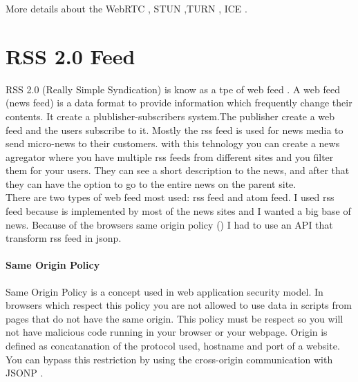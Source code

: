 More details about the WebRTC \cite{loreto2014real}, STUN \cite{mahy2003network},TURN \cite{mahy2010traversal}, ICE \cite{rosenberg2010interactive}.


\section{RSS 2.0 Feed}
\label{sec:rss}

RSS 2.0 (Really Simple Syndication) \cite{board2014rss} is know as a tpe of web feed \cite{downing2008web}.
A web feed (news feed) is a data format to provide information which frequently change their contents.
It create a plublisher-subscribers system.The publisher create a web feed and the users subscribe to it.
Mostly the rss feed is used for news media to send micro-news to their customers. with this tehnology you can
create a news agregator where you have multiple rss feeds from different sites and you filter them for your users.
They can see a short description to the news, and after that they can have the option to go to the entire news
on the parent site. \\
There are two types of web feed most used: rss feed and atom feed. I used rss feed because is implemented by most
of the news sites and I wanted a big base of news. Because of the browsers same origin policy ()
 I had to use an API that transform rss feed in jsonp.


\paragraph{Same Origin Policy}
Same Origin Policy \cite{network10same} is a concept used in web application security model. In browsers which respect this policy
you are not allowed to use data in scripts from pages that do not have the same origin. This policy must be respect so you will not have
malicious code running in your browser or your webpage. Origin is defined as concatanation of
the protocol used, hostname and port of a website. You can bypass this restriction by using the cross-origin communication
with JSONP \cite{ozses2009cross}.


